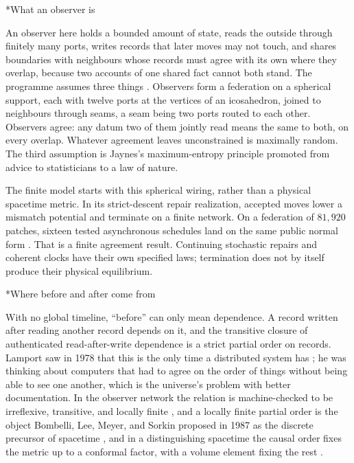 \documentclass[12pt]{article}
\makeatletter
\renewcommand\section{\@startsection{section}{1}{\z@}{-1.4ex plus -0.4ex minus -0.2ex}{0.7ex plus 0.1ex}{\normalfont\large\bfseries}}
\makeatother
\begin{document}
\begin{doublespace}
\section*{What an observer is}

An observer here holds a bounded amount of state, reads the outside through finitely many ports, writes records that later moves may not touch, and shares boundaries with neighbours whose records must agree with its own where they overlap, because two accounts of one shared fact cannot both stand. The programme assumes three things \cite{ophflagship}. Observers form a federation on a spherical support, each with twelve ports at the vertices of an icosahedron, joined to neighbours through seams, a seam being two ports routed to each other. Observers agree: any datum two of them jointly read means the same to both, on every overlap. Whatever agreement leaves unconstrained is maximally random. The third assumption is Jaynes's maximum-entropy principle \cite{jaynes1957} promoted from advice to statisticians to a law of nature.

The finite model starts with this spherical wiring, rather than a physical spacetime metric. In its strict-descent repair realization, accepted moves lower a mismatch potential and terminate on a finite network. On a federation of $81{,}920$ patches, sixteen tested asynchronous schedules land on the same public normal form \cite{ophrepo}. That is a finite agreement result. Continuing stochastic repairs and coherent clocks have their own specified laws; termination does not by itself produce their physical equilibrium.

\section*{Where before and after come from}

With no global timeline, ``before'' can only mean dependence. A record written after reading another record depends on it, and the transitive closure of authenticated read-after-write dependence is a strict partial order on records. Lamport saw in 1978 that this is the only time a distributed system has \cite{lamport1978}; he was thinking about computers that had to agree on the order of things without being able to see one another, which is the universe's problem with better documentation. In the observer network the relation is machine-checked to be irreflexive, transitive, and locally finite \cite{ophflagship}, and a locally finite partial order is the object Bombelli, Lee, Meyer, and Sorkin proposed in 1987 as the discrete precursor of spacetime \cite{bombelli1987}, and in a distinguishing spacetime the causal order fixes the metric up to a conformal factor, with a volume element fixing the rest \cite{malament1977,hawkingkingmccarthy1976}.


\end{doublespace}
\end{document}

